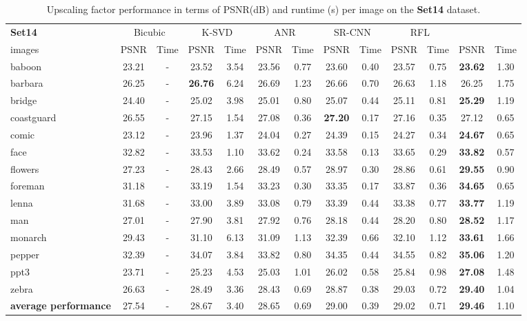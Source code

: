 \documentclass[10pt,journal,compsoc]{IEEEtran}
\begin{document}
\begin{table*}[t!]
\centering
\begin{tabular}{|l| c| c| c| c| c| c| c| c| c| c|c| c|}
\hline
\textbf{Set14} & \multicolumn{2}{c|}{Bicubic}& \multicolumn{2}{c|}{K-SVD \cite{SRKSVD}}& \multicolumn{2}{c|}{ANR \cite{ANR}}
& \multicolumn{2}{c|}{SR-CNN \cite{SRCNN}} & \multicolumn{2}{c|}{RFL \cite{schulter15}} 
& \multicolumn{2}{c|}{} \\
\cline{2-13}
images& PSNR & Time& PSNR & Time& PSNR & Time& PSNR & Time& PSNR & Time& PSNR & Time\\
\hline\hline
baboon & 23.21 & - &23.52 & 3.54 & 23.56 & 0.77 & 23.60 & 0.40 & 23.57 & 0.75 & \textbf{23.62} & 1.30\\
barbara & 26.25 & - &\textbf{26.76} & 6.24 & 26.69 & 1.23 & 26.66 & 0.70 & 26.63 & 1.18 & 26.25 & 1.75 \\
bridge & 24.40 & - & 25.02 & 3.98 & 25.01 & 0.80 & 25.07 & 0.44 & 25.11 & 0.81 & \textbf{25.29} & 1.19\\
coastguard & 26.55 & - & 27.15 & 1.54 &27.08 & 0.36 & \textbf{27.20} & 0.17 & 27.16 & 0.35 & 27.12 & 0.65\\
comic & 23.12 & - & 23.96 & 1.37 & 24.04 & 0.27 & 24.39 & 0.15 & 24.27 & 0.34 & \textbf{24.67} & 0.65\\
face & 32.82 & - & 33.53 & 1.10 & 33.62 & 0.24 & 33.58 & 0.13 & 33.65 & 0.29 & \textbf{33.82} & 0.57\\
flowers & 27.23 & - & 28.43 & 2.66 &28.49 & 0.57 & 28.97 & 0.30 & 28.86 & 0.61 & \textbf{29.55} & 0.90\\
foreman & 31.18 & - & 33.19 & 1.54 & 33.23 & 0.30 & 33.35 & 0.17 & 33.87 & 0.36 & \textbf{34.65} & 0.65\\
lenna & 31.68 & - & 33.00 & 3.89 & 33.08 & 0.79 & 33.39 & 0.44 & 33.38 & 0.77 & \textbf{33.77 } & 1.19 \\
man & 27.01 & - & 27.90 & 3.81 & 27.92 & 0.76 & 28.18 & 0.44 & 28.20 & 0.80 & \textbf{28.52} & 1.17\\
monarch & 29.43 & - & 31.10 & 6.13 &31.09 & 1.13 & 32.39 & 0.66 & 32.10 & 1.12 & \textbf{33.61} & 1.66\\
pepper & 32.39 & - & 34.07 & 3.84 & 33.82 & 0.80 & 34.35 & 0.44 & 34.55 & 0.82 & \textbf{35.06} & 1.20\\
ppt3 & 23.71 & - & 25.23 & 4.53 & 25.03 & 1.01 & 26.02 & 0.58 & 25.84 & 0.98 & \textbf{27.08} & 1.48\\
zebra & 26.63 & - & 28.49 & 3.36 & 28.43 & 0.69 & 28.87 & 0.38 & 29.03 & 0.72 & \textbf{29.40} & 1.04\\
\hline\hline
\rowcolor[gray]{0.85} \textbf{average performance} 
& 27.54 & - & 28.67 & 3.40 & 28.65 & 0.69 & 29.00 & 0.39 & 29.02 & 0.71 & \textbf{29.46} & 1.10\\
\hline
\end{tabular}\vspace*{0.2cm}
\caption{Upscaling factor  performance in terms of PSNR(dB) and runtime (s) per image on the 
\textbf{Set14} dataset.}\label{table:set14}
\vspace*{-0.75cm}
\end{table*}
\end{document}
